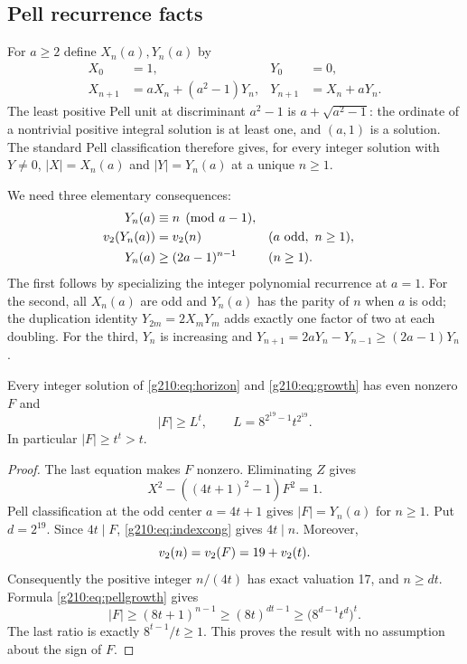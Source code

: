 \subsection{Pell recurrence facts}

For $a\ge2$ define $X_n(a),Y_n(a)$ by
\begin{align*}
X_0&=1,&Y_0&=0,\\
X_{n+1}&=aX_n+(a^2-1)Y_n,&Y_{n+1}&=X_n+aY_n.
\end{align*}
The least positive Pell unit at discriminant $a^2-1$ is
$a+\sqrt{a^2-1}$: the ordinate of a nontrivial positive integral solution
is at least one, and $(a,1)$ is a solution. The standard Pell classification
therefore gives, for every integer solution with $Y\ne0$,
$|X|=X_n(a)$ and $|Y|=Y_n(a)$ at a unique $n\ge1$.

We need three elementary consequences:
\begin{align}
Y_n(a)&\equiv n\pmod{a-1},\label{g210:eq:indexcong}\\
\vp(Y_n(a))&=\vp(n) &&(a\hbox{ odd},\ n\ge1),\label{g210:eq:valuation}\\
Y_n(a)&\ge(2a-1)^{n-1} &&(n\ge1).\label{g210:eq:pellgrowth}
\end{align}
The first follows by specializing the integer polynomial recurrence at
$a=1$. For the second, all $X_n(a)$ are odd and $Y_n(a)$ has the parity of
$n$ when $a$ is odd; the duplication identity
$Y_{2m}=2X_mY_m$ adds exactly one factor of two at each doubling. For the
third, $Y_n$ is increasing and
$Y_{n+1}=2aY_n-Y_{n-1}\ge(2a-1)Y_n$.

\begin{theorem}\label{g210:thm:growth}
Every integer solution of \eqref{g210:eq:horizon} and \eqref{g210:eq:growth} has even
nonzero $F$ and
\[
|F|\ge L^t,\qquad L=8^{2^{19}-1}t^{2^{19}}.
\]
In particular $|F|\ge t^t>t$.
\end{theorem}
\begin{proof}
The last equation makes $F$ nonzero. Eliminating $Z$ gives
\[
X^2-((4t+1)^2-1)F^2=1.
\]
Pell classification at the odd center $a=4t+1$ gives
$|F|=Y_n(a)$ for $n\ge1$. Put $d=2^{19}$. Since $4t\mid F$,
\eqref{g210:eq:indexcong} gives $4t\mid n$. Moreover,
\[
v_2(n)=v_2(F)=19+v_2(t).
\]
Consequently the positive integer $n/(4t)$ has exact valuation 17, and
$n\ge dt$. Formula \eqref{g210:eq:pellgrowth} gives
\[
|F|\ge(8t+1)^{n-1}\ge(8t)^{dt-1}\ge
\bigl(8^{d-1}t^d\bigr)^t.
\]
The last ratio is exactly $8^{t-1}/t\ge1$. This proves the result with no
assumption about the sign of $F$.
\end{proof}

